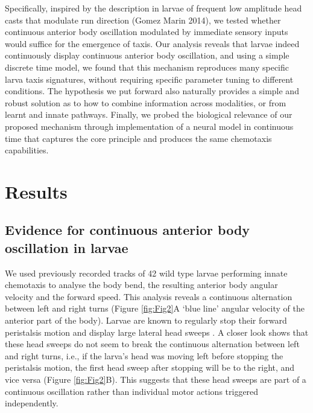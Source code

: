 \documentclass[10pt,a4paper]{article}
\begin{document}
Specifically, inspired by the description in larvae of frequent low amplitude head casts that modulate run direction (Gomez Marin 2014), we tested whether continuous anterior body oscillation modulated by immediate sensory inputs would suffice for the emergence of taxis. Our analysis reveals that larvae indeed continuously display continuous anterior body oscillation, and using a simple discrete time model, we found that this mechanism reproduces many specific larva taxis signatures, without requiring specific parameter tuning to different conditions. The hypothesis we put forward also naturally provides a simple and robust solution as to how to combine information across modalities, or from learnt and innate pathways. Finally, we probed the biological relevance of our proposed mechanism through implementation of a neural model in continuous time that captures the core principle and produces the same chemotaxis capabilities.

\section{Results}
\subsection{Evidence for continuous anterior body oscillation in larvae}
 We used previously recorded tracks of 42 wild type larvae performing innate chemotaxis \citep{gomez2012active} to analyse the body bend, the resulting anterior body angular velocity and the forward speed. This analysis reveals a continuous alternation between left and right turns (Figure \ref{fig:Fig2}A ‘blue line’ angular velocity of the anterior part of the body). Larvae are known to regularly stop their forward peristalsis motion and display large lateral head sweeps \citep{gomez2011active}. A closer look 
 shows that these head sweeps do not seem to break the continuous alternation between left and right turns, i.e., if the larva’s head was moving left before stopping the peristalsis motion, the first head sweep after stopping will be to the right, and vice versa (Figure \ref{fig:Fig2}B). This suggests that these head sweeps are part of a continuous oscillation rather than individual motor actions triggered independently.
\end{document}
